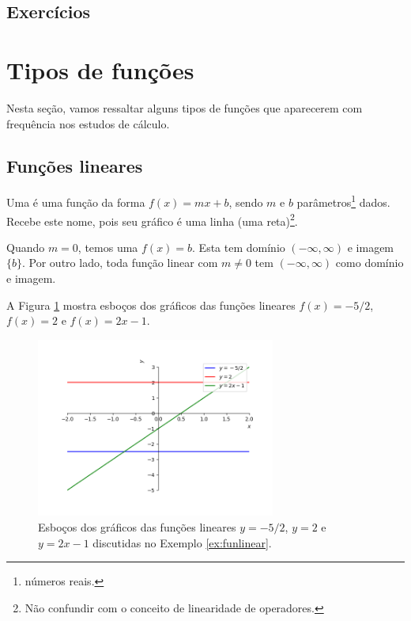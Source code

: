 \subsection*{Exercícios}

\emconstrucao

\section{Tipos de funções}\label{cap_funcao_sec_tipofun}

Nesta seção, vamos ressaltar alguns tipos de funções que aparecerem com frequência nos estudos de cálculo.

\subsection{Funções lineares}

Uma  é uma função da forma $f(x) = mx + b$, sendo $m$ e $b$ parâmetros\footnote{números reais.} dados. Recebe este nome, pois seu gráfico é uma linha (uma reta)\footnote{Não confundir com o conceito de linearidade de operadores.}.

Quando $m=0$, temos uma  $f(x) = b$. Esta tem domínio $(-\infty, \infty)$ e imagem $\{b\}$. Por outro lado, toda função linear com $m\neq 0$ tem $(-\infty, \infty)$ como domínio e imagem.

\begin{ex}\label{ex:funlinear}
  A Figura \ref{fig:ex_funlinear} mostra esboços dos gráficos das funções lineares $f(x)=-5/2$, $f(x)=2$ e $f(x)=2x-1$.
  
  \begin{figure}[h!]
    \centering
    \includegraphics[width=0.7\textwidth]{./cap_funcao/dados/fig_ex_funlinear/fig_ex_funlinear}
    \caption{Esboços dos gráficos das funções lineares $y=-5/2$, $y=2$ e $y=2x-1$ discutidas no Exemplo \ref{ex:funlinear}.}
    \label{fig:ex_funlinear}
  \end{figure}
\end{ex}

